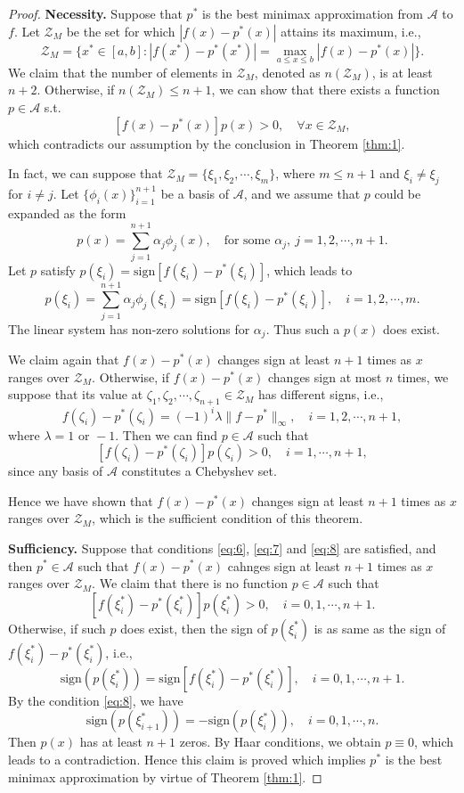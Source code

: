 \documentclass[11pt]{article}
\begin{document}
\begin{proof}
{\bf Necessity.} Suppose that $p^*$ is the best minimax approximation from $\mathscr{A}$ to $f$. Let $\mathscr{Z}_M$ be the set for which $|f(x)-p^*(x)|$ attains its maximum, i.e.,
$$
\mathscr{Z}_M = \{x^* \in [a,b]: |f(x^*) - p^*(x^*)| = \max_{a\leqslant x \leqslant b} |f(x) - p^*(x)| \}.
$$
We claim that the number of elements in $\mathscr{Z}_M$, denoted as $n(\mathscr{Z}_M)$, is at least $n+2$. Otherwise, if $n(\mathscr{Z}_M) \leqslant n+1$, we can show that there exists a function $p\in\mathscr{A}$ s.t.
$$
[f(x)-p^*(x)] p(x) >0,\quad \forall x\in\mathscr{Z}_M,
$$
which contradicts our assumption by the conclusion in Theorem \ref{thm:1}.

In fact, we can
suppose that $\mathscr{Z}_M = \{\xi_1,\xi_2,\cdots,\xi_{m}\}$, where $m \leqslant n+1$ and $\xi_i\neq\xi_j$ for $i\neq j$. Let $\{\phi_i(x)\}_{i=1}^{n+1}$ be a basis of $\mathscr{A}$, and we assume that $p$ could be expanded as the form
$$
p(x) = \sum_{j=1}^{n+1} \alpha_j \phi_j(x),\quad \text{for some } \alpha_j, \ j=1,2,\cdots,n+1.
$$
Let $p$ satisfy $p(\xi_i) = \mathrm{sign}[f(\xi_i)-p^*(\xi_i)]$, which leads to
$$
p(\xi_i) = \sum_{j=1}^{n+1} \alpha_j \phi_j(\xi_i) = \mathrm{sign}[f(\xi_i)-p^*(\xi_i)], \quad i=1,2,\cdots,m.
$$
The linear system has non-zero solutions for $\alpha_j$. Thus such a $p(x)$ does exist.

We claim again that $f(x)-p^*(x)$ changes sign at least $n+1$ times as $x$ ranges over $\mathscr{Z}_M$. Otherwise, if $f(x)-p^*(x)$ changes sign at most $n$ times, we suppose that its value at $\zeta_1,\zeta_2,\cdots,\zeta_{n+1} \in \mathscr{Z}_M$ has different signs, i.e., 
$$
f(\zeta_i) - p^*(\zeta_i) = (-1)^i \lambda \|f-p^*\|_\infty,\quad i=1,2,\cdots,n+1,
$$
where $\lambda = 1\text{ or } -1$. Then we can find $p\in\mathscr{A}$ such that 
$$
[f(\zeta_i) - p^*(\zeta_i)] p(\zeta_i) > 0,\quad i=1,\cdots,n+1,
$$
since any basis of $\mathscr{A}$ constitutes a Chebyshev set.

Hence we have shown that $f(x)-p^*(x)$ changes sign at least $n+1$ times as $x$ ranges over $\mathscr{Z}_M$, which is the sufficient condition of this theorem.

{\bf Sufficiency.} Suppose that conditions \eqref{eq:6}, \eqref{eq:7} and \eqref{eq:8} are satisfied, and then $p^*\in\mathscr{A}$ such that $f(x) - p^*(x)$ cahnges sign at least $n+1$ times as $x$ ranges over $\mathscr{Z}_M$. We claim that there is no function $p\in\mathscr{A}$ such that 
$$
[f(\xi_i^*) - p^*(\xi^*_i)] p(\xi_i^*) > 0, \quad i=0,1,\cdots,n+1.
$$
Otherwise, if such $p$ does exist, then the sign of $p(\xi^*_i)$ is as same as the sign of $f(\xi^*_i)-p^*(\xi^*_i)$, i.e.,
$$
\mathrm{sign}(p(\xi^*_i)) = \mathrm{sign}[f(\xi^*_i)-p^*(\xi^*_i)],\quad i=0,1,\cdots,n+1.
$$
By the condition \eqref{eq:8}, we have 
$$
\mathrm{sign}(p(\xi^*_{i+1})) = - \mathrm{sign}(p(\xi^*_i)),\quad i=0,1,\cdots,n.
$$
Then $p(x)$ has at least $n+1$ zeros. By Haar conditions, we obtain $p\equiv 0$, which leads to a contradiction. Hence this claim is proved which implies $p^*$ is the best minimax approximation by virtue of Theorem \ref{thm:1}.
\end{proof}
\end{document}

